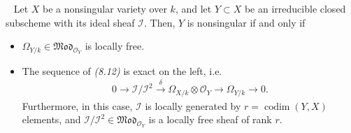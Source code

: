 \documentclass[11pt,a4paper,footinclude=true,headinclude=true]{scrbook} %
\DeclareMathOperator{\codim}{codim}
\newcommand{\II}{\mathscr{I}}
\newcommand{\OO}{\mathcal{O}}
\newcommand{\<}{\langle}
\newcommand{\>}{\rangle}
\newcommand{\MOD}{\mathfrak{Mod}}
\newenvironment{theorem}[2][]
{\renewcommand\theinnercustomthm{#2}\innercustomthm[#1]
\begin{mdframed}[backgroundcolor=yellow!20]\ }
{\end{mdframed}\endinnercustomthm}
\begin{document}
\begin{theorem}{8.17}
    Let $X$ be a nonsingular variety over $k$, and let $Y\subset X$ be an irreducible closed subscheme with its ideal sheaf $\II$. Then, $Y$ is nonsingular if and only if 
    \begin{itemize}
        \item[(1)] $\Omega_{Y/k}\in\MOD_{\OO_Y}$ is locally free.
        \item[(2)] The sequence of \textit{(8.12)} is exact on the left, i.e.
        \begin{align*}
            0\longrightarrow\II/\II^2\xrightarrow{~~\delta~~}\Omega_{X/k}\otimes\OO_Y\longrightarrow\Omega_{Y/k}\longrightarrow0.
        \end{align*}
        Furthermore, in this case, $\II$ is locally generated by $r=\codim(Y,X)$ elements, and $\II/\II^2\in\MOD_{\OO_Y}$ is a locally free sheaf of rank $r$.
    \end{itemize}
\end{theorem}
\end{document}
